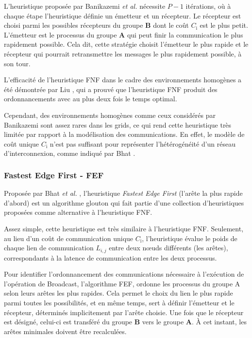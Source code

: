 L'heuristique proposée par Banikazemi \emph{et al.} nécessite $P-1$
itérations, où à chaque étape l'heuristique définie un émetteur et
un récepteur. Le récepteur est choisi parmi les possibles récepteurs
du groupe \textbf{B} dont le coût \emph{$C_{\textrm{i}}$} est le
plus petit. L'émetteur est le processus du groupe \textbf{A} qui peut
finir la communication le plus rapidement possible. Cela dit, cette
stratégie choisit l'émetteur le plus rapide et le récepteur qui pourrait
retransmettre les messages le plus rapidement possible, à son tour.

L'efficacité de l'heuristique FNF dans le cadre des environnements
homogènes a été démontrée par Liu \cite{PangfengLiu00b}, qui a prouvé que
l'heuristique FNF produit des ordonnancements avec au plus deux fois
le temps optimal.

Cependant, des environnements homogènes comme ceux considérés par
Banikazemi sont assez rares dans les grids, ce qui rend cette heuristique
très limitée par rapport à la modélisation des communications. En
effet, le modèle de coût unique $C_{\textrm{i}}$ n'est pas suffisant
pour représenter l'hétérogénéité d'un réseau d'interconnexion, comme
indiqué par Bhat \cite{Bhat03}. 


\subsubsection*{Fastest Edge First - FEF}

Proposée par Bhat \emph{et al.} \cite{Bhat03}, l'heuristique \emph{Fastest
	Edge First} (l'arête la plus rapide d'abord) est un algorithme glouton
qui fait partie d'une collection d'heuristiques proposées comme alternative
à l'heuristique FNF. 

Assez simple, cette heuristique est très similaire à l'heuristique
FNF. Seulement, au lieu d'un coût de communication unique $C_{\textrm{i}}$,
l'heuristique évalue le poids de chaque lien de communication $L_{i,j}$
entre deux n{\oe}uds différents (les arêtes), correspondants à la latence
de communication entre les deux processus. 

Pour identifier l'ordonnancement des communications nécessaire à l'exécution
de l'opération de Broadcast, l'algorithme FEF, ordonne les processus
du groupe A selon leurs arêtes les plus rapides. Cela permet le choix
du lien le plus rapide parmi toutes les possibilités, et en même temps,
sert à définir l'émetteur et le récepteur, déterminés implicitement
par l'arête choisie. Une fois que le récepteur est désigné, celui-ci
est transféré du groupe \textbf{B} vers le groupe \textbf{A}. À cet
instant, les arêtes minimales doivent être recalculées.

